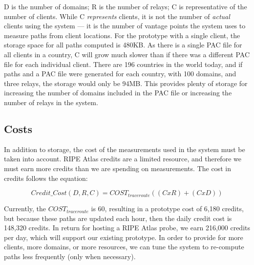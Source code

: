D is the number of domains; R is the number of relays; C is representative of the number of 
clients.  While C {\it represents} clients, it is not the number of {\it actual} clients using the 
system --- it is the number of vantage points the system uses to measure paths 
from client locations.  For the prototype with a single client, the storage space for all 
paths computed is 480KB.  As there is a single PAC file for all clients in 
a country, C will grow much slower than if there was a different PAC file for 
each individual client.  There are 196 countries in the world today, and if 
paths and a PAC file were generated for each country, with 100 domains, and 
three relays, the storage would only be 94MB.  This provides plenty of storage 
for increasing the number of domains included in the PAC file or increasing 
the number of relays in the system.

\subsection{Costs}
In addition to storage, the cost of the measurements used in the system must 
be taken into account.  RIPE Atlas credits are a limited resource, and therefore 
we must earn more credits than we are spending on measurements.  The cost 
in credits follows the equation:

\[Credit\_Cost(D,R,C) = COST_{traceroute}((C x R) + (C x D))\]

Currently, the $COST_{traceroute}$ is 60, resulting in a prototype cost of 6,180 
credits, but because these paths are updated each hour, then 
the daily credit cost is 148,320 credits.  In return for hosting a RIPE Atlas 
probe, we earn 216,000 credits per day, which will support our existing 
prototype.  In order to provide for more clients, more domains, or more 
resources, we can tune the system to re-compute paths less frequently (only when necessary).
